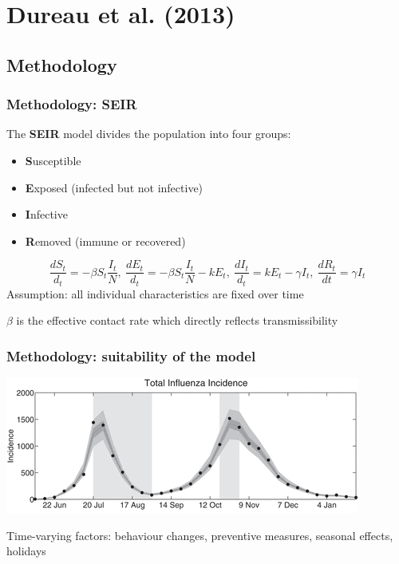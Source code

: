 \documentclass{beamer}
\begin{document}
\section{Dureau et al. (2013)}
\subsection{Methodology}

\begin{frame}
\frametitle{Methodology: SEIR}
The {\bf SEIR} model divides the population into four groups:
\begin{itemize}
    \item {\bf S}usceptible
    \item {\bf E}xposed (infected but not infective)
    \item {\bf I}nfective
    \item {\bf R}emoved (immune or recovered)
\end{itemize}
\vspace{1em}
$$\frac{dS_t}{d_t}=-\beta S_t \frac{I_t}{N}, \: \frac{dE_t}{d_t}=-\beta S_t \frac{I_t}{N} - kE_t, \: \frac{dI_t}{d_t}=kE_t-\gamma I_t, \: \frac{dR_t}{dt}=\gamma I_t$$
Assumption: all individual characteristics are fixed over time
\vspace{1em}


\vspace{1em}
$\beta$ is the effective contact rate which directly reflects transmissibility
\end{frame}

\begin{frame}
    \frametitle{Methodology: suitability of the model}
    \includegraphics[width=\linewidth]{incidence.png}
    \vspace{1em}

    Time-varying factors: behaviour changes, preventive measures, seasonal effects, holidays
\end{frame}
\end{document}
